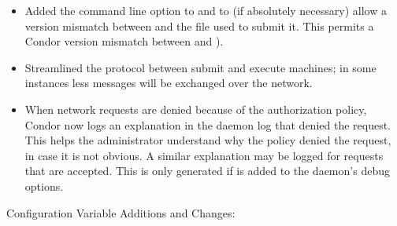 \begin{itemize}
\item Added the  command line option to
 and  to (if absolutely necessary)
allow a version mismatch between  and the
 file used to submit it.
This permits a Condor version mismatch between
 and ).

\item Streamlined the protocol between submit and execute machines; in some
	instances less messages will be exchanged over the network.

\item When network requests are denied because of the authorization
policy, Condor now logs an explanation in the daemon log that denied
the request.  This helps the administrator understand why the policy
denied the request, in case it is not obvious.  A similar explanation
may be logged for requests that are accepted.  This is only generated
if  is added to the daemon's debug options.

\end{itemize}

\noindent Configuration Variable Additions and Changes:

